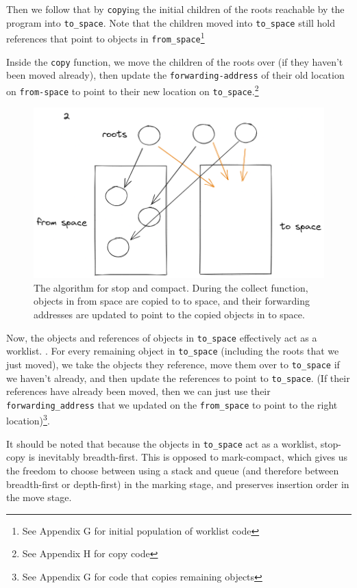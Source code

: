 \documentclass[index]{subfiles}
\begin{document}
Then we follow that by \verb+copy+ing the initial children of the roots reachable by the program into \verb+to_space+. Note that the children moved into \verb+to_space+ still hold references that point to objects in \verb+from_space+\footnote{See Appendix G for initial population of worklist code}

Inside the \verb+copy+ function, we move the children of the roots over (if they haven't been moved already), then update the \verb+forwarding-address+ of their old location on \verb+from-space+ to point to their new location on \verb+to_space+.\footnote{See Appendix H for copy code}

\begin{figure}[H]
    \centering
    \includegraphics[scale=0.3]{pics/visualization-of-worklist.png}
    \caption{The algorithm for stop and compact. During the collect function, objects in from space are copied to to space, and their forwarding addresses are updated to point to the copied objects in to space.}
\end{figure}

Now, the objects and references of objects in \verb+to_space+ effectively act as a worklist. . For every remaining object in \verb+to_space+ (including the roots that we just moved), we take the objects they reference, move them over to \verb+to_space+ if we haven't already, and then update the references to point to \verb+to_space+. (If their references have already been moved, then we can just use their \verb+forwarding_address+ that we updated on the \verb+from_space+ to point to the right location)\footnote{See Appendix G for code that copies remaining objects}.

It should be noted that because the objects in \verb+to_space+ act as a worklist, stop-copy is inevitably breadth-first. This is opposed to mark-compact, which gives us the freedom to choose between using a stack and queue (and therefore between breadth-first or depth-first) in the marking stage, and preserves insertion order in the move stage.
\end{document}
